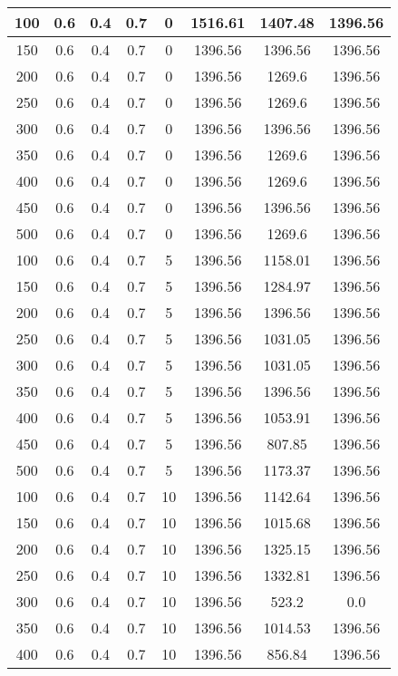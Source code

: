 \documentclass[a4paper, 12pt]{extreport}
\begin{document}
\begin{itemize}
\begin{longtable}{|c|c|c|c|c|c|c|c|}
			100 & 0.6 & 0.4 & 0.7 & 0 & 1516.61 & 1407.48 & 1396.56 \\\hline
			150 & 0.6 & 0.4 & 0.7 & 0 & 1396.56 & 1396.56 & 1396.56 \\\hline
			200 & 0.6 & 0.4 & 0.7 & 0 & 1396.56 & 1269.6 & 1396.56 \\\hline
			250 & 0.6 & 0.4 & 0.7 & 0 & 1396.56 & 1269.6 & 1396.56 \\\hline
			300 & 0.6 & 0.4 & 0.7 & 0 & 1396.56 & 1396.56 & 1396.56 \\\hline
			350 & 0.6 & 0.4 & 0.7 & 0 & 1396.56 & 1269.6 & 1396.56 \\\hline
			400 & 0.6 & 0.4 & 0.7 & 0 & 1396.56 & 1269.6 & 1396.56 \\\hline
			450 & 0.6 & 0.4 & 0.7 & 0 & 1396.56 & 1396.56 & 1396.56 \\\hline
			500 & 0.6 & 0.4 & 0.7 & 0 & 1396.56 & 1269.6 & 1396.56 \\\hline
			100 & 0.6 & 0.4 & 0.7 & 5 & 1396.56 & 1158.01 & 1396.56 \\\hline
			150 & 0.6 & 0.4 & 0.7 & 5 & 1396.56 & 1284.97 & 1396.56 \\\hline
			200 & 0.6 & 0.4 & 0.7 & 5 & 1396.56 & 1396.56 & 1396.56 \\\hline
			250 & 0.6 & 0.4 & 0.7 & 5 & 1396.56 & 1031.05 & 1396.56 \\\hline
			300 & 0.6 & 0.4 & 0.7 & 5 & 1396.56 & 1031.05 & 1396.56 \\\hline
			350 & 0.6 & 0.4 & 0.7 & 5 & 1396.56 & 1396.56 & 1396.56 \\\hline
			400 & 0.6 & 0.4 & 0.7 & 5 & 1396.56 & 1053.91 & 1396.56 \\\hline
			450 & 0.6 & 0.4 & 0.7 & 5 & 1396.56 & 807.85 & 1396.56 \\\hline
			500 & 0.6 & 0.4 & 0.7 & 5 & 1396.56 & 1173.37 & 1396.56 \\\hline
			100 & 0.6 & 0.4 & 0.7 & 10 & 1396.56 & 1142.64 & 1396.56 \\\hline
			150 & 0.6 & 0.4 & 0.7 & 10 & 1396.56 & 1015.68 & 1396.56 \\\hline
			200 & 0.6 & 0.4 & 0.7 & 10 & 1396.56 & 1325.15 & 1396.56 \\\hline
			250 & 0.6 & 0.4 & 0.7 & 10 & 1396.56 & 1332.81 & 1396.56 \\\hline
			300 & 0.6 & 0.4 & 0.7 & 10 & 1396.56 & 523.2 & 0.0 \\\hline
			350 & 0.6 & 0.4 & 0.7 & 10 & 1396.56 & 1014.53 & 1396.56 \\\hline
			400 & 0.6 & 0.4 & 0.7 & 10 & 1396.56 & 856.84 & 1396.56 \\\hline

\end{longtable}
\end{itemize}
\end{document}
